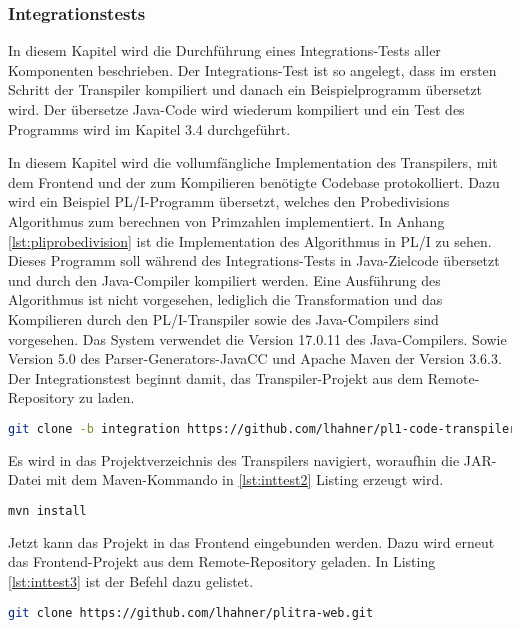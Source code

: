 \subsubsection{Integrationstests}
In diesem Kapitel wird die Durchführung eines Integrations-Tests aller Komponenten beschrieben. Der Integrations-Test ist so angelegt, dass im ersten Schritt der Transpiler kompiliert und danach ein Beispielprogramm übersetzt wird. Der übersetze Java-Code wird wiederum kompiliert und ein Test des Programms wird im Kapitel 3.4 durchgeführt.

In diesem Kapitel wird die vollumfängliche Implementation des Transpilers, mit dem Frontend und der zum Kompilieren benötigte Codebase protokolliert. Dazu wird ein Beispiel PL/I-Programm übersetzt, welches den Probedivisions Algorithmus zum berechnen von Primzahlen implementiert. 
In Anhang \ref{lst:pliprobedivision} ist die Implementation des Algorithmus in PL/I zu sehen. Dieses Programm soll während des Integrations-Tests in Java-Zielcode übersetzt und durch den Java-Compiler kompiliert werden.
Eine Ausführung des Algorithmus ist nicht vorgesehen, lediglich die Transformation und das Kompilieren durch den PL/I-Transpiler sowie des Java-Compilers sind vorgesehen. Das System verwendet die Version 17.0.11 des Java-Compilers. Sowie Version 5.0 des Parser-Generators-JavaCC und Apache Maven der Version 3.6.3. Der Integrationstest beginnt damit, das Transpiler-Projekt aus dem Remote-Repository zu laden.

\begin{lstlisting}[language=Bash, caption=Laden des Transpilers, label={lst:inttest1}]
git clone -b integration https://github.com/lhahner/pl1-code-transpiler.git
\end{lstlisting} 

Es wird in das Projektverzeichnis des Transpilers navigiert, woraufhin die JAR-Datei mit dem Maven-Kommando in \ref{lst:inttest2} Listing erzeugt wird.

\begin{lstlisting}[language=Bash, caption=Erzeugen der JAR, label={lst:inttest2}]
mvn install
\end{lstlisting}

Jetzt kann das Projekt in das Frontend eingebunden werden. Dazu wird erneut das Frontend-Projekt aus dem Remote-Repository geladen. In Listing \ref{lst:inttest3} ist der Befehl dazu gelistet.

\begin{lstlisting}[language=Bash, caption=Laden des Frontend-Projekts, label={lst:inttest3}]
git clone https://github.com/lhahner/plitra-web.git
\end{lstlisting}

